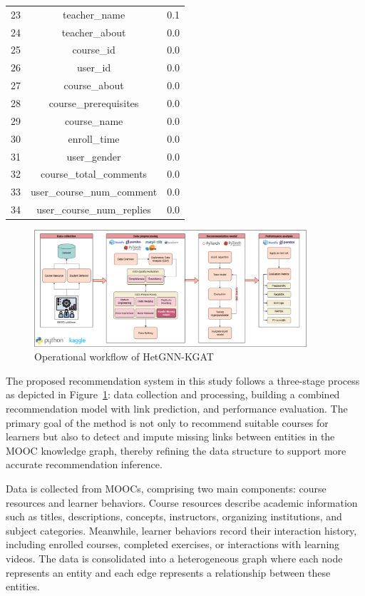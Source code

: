 \documentclass{ieeeaccess}
\begin{document}
\begin{table}[h]
{{\begin{tabular}{ccc}
                23 & teacher\_name & 0.1 \\
                24 & teacher\_about & 0.0 \\
                25 & course\_id & 0.0 \\
                26 & user\_id & 0.0 \\
                27 & course\_about & 0.0 \\
                28 & course\_prerequisites & 0.0 \\
                29 & course\_name & 0.0 \\
                30 & enroll\_time & 0.0 \\
                31 & user\_gender & 0.0 \\
                32 & course\_total\_comments & 0.0 \\
                33 & user\_course\_num\_comment & 0.0 \\
                34 & user\_course\_num\_replies & 0.0 \\
            \end{tabular}
        }
    }
\end{table}


\begin{figure}[!t]
\centering
\includegraphics[width=0.9\textwidth]{imgs/framework_journal.png}
\caption{Operational workflow of HetGNN-KGAT}
\label{fig:framework}
\end{figure}
The proposed recommendation system in this study follows a three-stage process as depicted in Figure~\ref{fig:framework}: data collection and processing, building a combined recommendation model with link prediction, and performance evaluation. The primary goal of the method is not only to recommend suitable courses for learners but also to detect and impute missing links between entities in the MOOC knowledge graph, thereby refining the data structure to support more accurate recommendation inference.

Data is collected from MOOCs, comprising two main components: course resources and learner behaviors. Course resources describe academic information such as titles, descriptions, concepts, instructors, organizing institutions, and subject categories. Meanwhile, learner behaviors record their interaction history, including enrolled courses, completed exercises, or interactions with learning videos. The data is consolidated into a heterogeneous graph where each node represents an entity and each edge represents a relationship between these entities.
\end{document}
